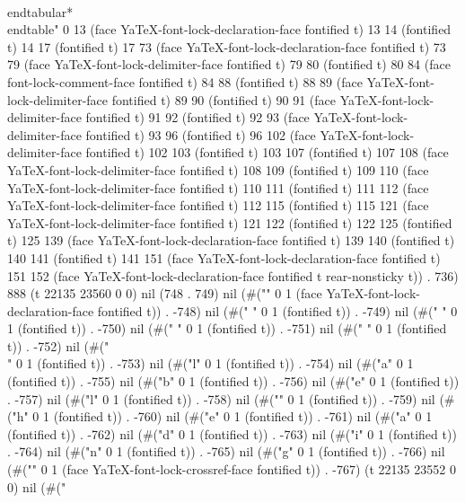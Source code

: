{   \\end{tabular*}
 \\end{table}" 0 13 (face YaTeX-font-lock-declaration-face fontified t) 13 14 (fontified t) 14 17 (fontified t) 17 73 (face YaTeX-font-lock-declaration-face fontified t) 73 79 (face YaTeX-font-lock-delimiter-face fontified t) 79 80 (fontified t) 80 84 (face font-lock-comment-face fontified t) 84 88 (fontified t) 88 89 (face YaTeX-font-lock-delimiter-face fontified t) 89 90 (fontified t) 90 91 (face YaTeX-font-lock-delimiter-face fontified t) 91 92 (fontified t) 92 93 (face YaTeX-font-lock-delimiter-face fontified t) 93 96 (fontified t) 96 102 (face YaTeX-font-lock-delimiter-face fontified t) 102 103 (fontified t) 103 107 (fontified t) 107 108 (face YaTeX-font-lock-delimiter-face fontified t) 108 109 (fontified t) 109 110 (face YaTeX-font-lock-delimiter-face fontified t) 110 111 (fontified t) 111 112 (face YaTeX-font-lock-delimiter-face fontified t) 112 115 (fontified t) 115 121 (face YaTeX-font-lock-delimiter-face fontified t) 121 122 (fontified t) 122 125 (fontified t) 125 139 (face YaTeX-font-lock-declaration-face fontified t) 139 140 (fontified t) 140 141 (fontified t) 141 151 (face YaTeX-font-lock-declaration-face fontified t) 151 152 (face YaTeX-font-lock-declaration-face fontified t rear-nonsticky t)) . 736) 888 (t 22135 23560 0 0) nil (748 . 749) nil (#("}" 0 1 (face YaTeX-font-lock-declaration-face fontified t)) . -748) nil (#("
" 0 1 (fontified t)) . -749) nil (#(" " 0 1 (fontified t)) . -750) nil (#(" " 0 1 (fontified t)) . -751) nil (#(" " 0 1 (fontified t)) . -752) nil (#("\\" 0 1 (fontified t)) . -753) nil (#("l" 0 1 (fontified t)) . -754) nil (#("a" 0 1 (fontified t)) . -755) nil (#("b" 0 1 (fontified t)) . -756) nil (#("e" 0 1 (fontified t)) . -757) nil (#("l" 0 1 (fontified t)) . -758) nil (#("{" 0 1 (fontified t)) . -759) nil (#("h" 0 1 (fontified t)) . -760) nil (#("e" 0 1 (fontified t)) . -761) nil (#("a" 0 1 (fontified t)) . -762) nil (#("d" 0 1 (fontified t)) . -763) nil (#("i" 0 1 (fontified t)) . -764) nil (#("n" 0 1 (fontified t)) . -765) nil (#("g" 0 1 (fontified t)) . -766) nil (#("}" 0 1 (face YaTeX-font-lock-crossref-face fontified t)) . -767) (t 22135 23552 0 0) nil (#("
